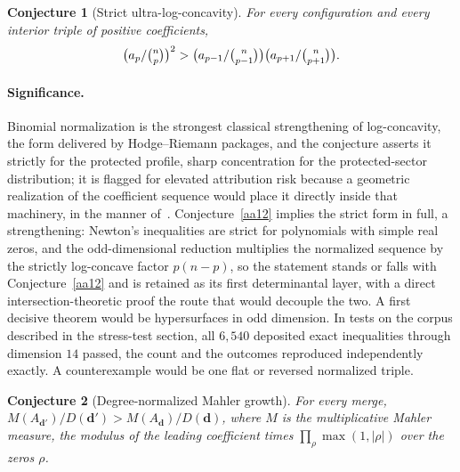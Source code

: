 \documentclass[11pt]{article}
\newtheorem{conjecture}{Conjecture}
\theoremstyle{definition}
\begin{document}
\begin{conjecture}[Strict ultra-log-concavity]\label{aa13}
For every configuration and every interior triple of positive coefficients,
\[
\bigl(a_p/\tbinom np\bigr)^2>\bigl(a_{p-1}/\tbinom n{p-1}\bigr)\bigl(a_{p+1}/\tbinom n{p+1}\bigr).
\]
\end{conjecture}

\paragraph{Significance.}
Binomial normalization is the strongest classical strengthening of log-concavity, the form delivered by Hodge--Riemann packages, and the conjecture asserts it strictly for the protected profile, sharp concentration for the protected-sector distribution; it is flagged for elevated attribution risk because a geometric realization of the coefficient sequence would place it directly inside that machinery, in the manner of~\cite{AHK18}.  Conjecture~\ref{aa12} implies the strict form in full, a strengthening: Newton's inequalities are strict for polynomials with simple real zeros, and the odd-dimensional reduction multiplies the normalized sequence by the strictly log-concave factor $p(n-p)$, so the statement stands or falls with Conjecture~\ref{aa12} and is retained as its first determinantal layer, with a direct intersection-theoretic proof the route that would decouple the two.  A first decisive theorem would be hypersurfaces in odd dimension.  In tests on the corpus described in the stress-test section, all $6{,}540$ deposited exact inequalities through dimension $14$ passed, the count and the outcomes reproduced independently exactly.  A counterexample would be one flat or reversed normalized triple.

\begin{conjecture}[Degree-normalized Mahler growth]\label{aa14}
For every merge, $M(A_{\mathbf d'})/D(\mathbf d')>M(A_{\mathbf d})/D(\mathbf d)$, where $M$ is the multiplicative Mahler measure, the modulus of the leading coefficient times $\prod_{\rho}\max(1,|\rho|)$ over the zeros $\rho$.
\end{conjecture}
\end{document}
